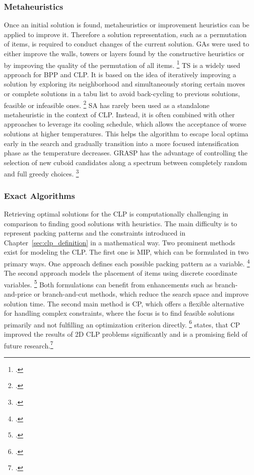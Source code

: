 \subsubsection{Metaheuristics}
Once an initial solution is found, metaheuristics or improvement heuristics can be applied
to improve it. Therefore a solution representation, such as a permutation of items, is required
to conduct changes of the current solution. \gls{GA}s were
used to either improve the walls, towers or layers found by the constructive heuristics
or by improving the quality of the permutation of all items. \footcite[cf.][]{gehring_genetic_1997}
\gls{TS} is a widely used approach for \gls{BPP} and \gls{CLP}. It is based on
the idea of iteratively improving a solution by exploring its neighborhood and simultaneously
storing certain moves or complete solutions in a tabu list to avoid back-cycling to
previous solutions, feasible or infeasible ones. \footcite[cf.][pp. 344--345]{gendreau_tabu_2006} \gls{SA} has rarely been used as a
standalone metaheuristic in the context of \gls{CLP}. Instead, it is often combined
with other approaches to leverage its cooling schedule, which allows the acceptance of
worse solutions at higher temperatures. This helps the algorithm to escape local optima
early in the search and gradually transition into a more focused intensification phase as
the temperature decreases. \gls{GRASP} has the advantage of controlling the selection of new
cuboid candidates along a spectrum between completely random and full greedy choices. \footcite[cf.][]{moura_grasp_2005}

\subsubsection{Exact Algorithms}
Retrieving optimal solutions for the \gls{CLP} is computationally challenging in comparison
to finding good solutions with heuristics. The main difficulty is to represent packing
patterns and the constraints introduced in Chapter~\ref{sec:clp_definition} in a mathematical way.
Two prominent methods exist for modeling the \gls{CLP}. The first one is \gls{MIP}, which can be
formulated in two primary ways. One approach defines each possible packing pattern as
a variable. \footcite[cf.][pp. 29--30]{zhu_prototype_2012} The second approach models
the placement of items using discrete coordinate variables. \footcite[cf.][pp. 4--8]{moura_integrated_2009}
Both formulations can benefit from enhancements such as branch-and-price or branch-and-cut
methods, which reduce the search space and improve solution time.
The second main method is \gls{CP}, which offers a flexible alternative for handling
complex constraints, where the focus is to find feasible solutions primarily and
not fulfilling an optimization criterion directly. \footcites[cf.][pp. 5--8]{kucuk_constraint_2022}[cf.][pp. 7--11]{tamke_branch-and-cut_2024} \citeauthor*{iori_exact_2021} states, that
\gls{CP} improved the results of 2D \gls{CLP} problems significantly and is a promising
field of future research.\footcite[cf.][p. 23]{iori_exact_2021}

